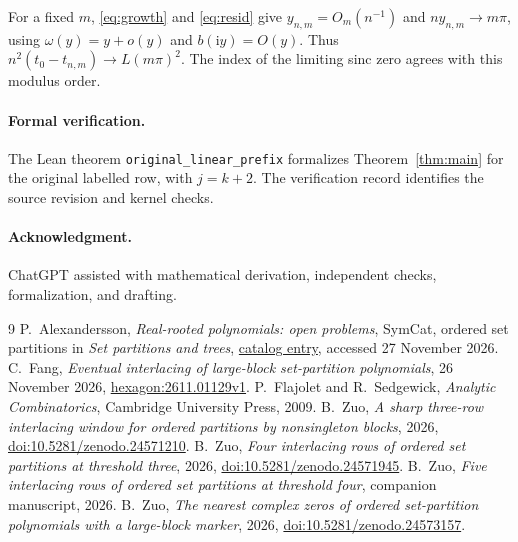 \documentclass[11pt]{article}
\newcommand{\ii}{\mathrm i}
\begin{document}
For a fixed $m$, \eqref{eq:growth} and \eqref{eq:resid} give
$y_{n,m}=O_m(n^{-1})$ and $ny_{n,m}\to m\pi$, using
$\omega(y)=y+o(y)$ and $b(\ii y)=O(y)$. Thus
$n^2(t_0-t_{n,m})\to L(m\pi)^2$. The index of the limiting
sinc zero agrees with this modulus order.

\paragraph{Formal verification.}
The Lean theorem \texttt{original\_linear\_prefix} formalizes
Theorem~\ref{thm:main} for the original labelled row, with $j=k+2$.
The verification record identifies the source revision and kernel checks.

\paragraph{Acknowledgment.}
ChatGPT assisted with mathematical derivation, independent checks,
formalization, and drafting.

\begingroup
\small
\raggedright
\begin{thebibliography}{9}
P.~Alexandersson, \emph{Real-rooted polynomials: open problems},
SymCat, ordered set partitions in \emph{Set partitions and trees},
\href{https://www.symmetricfunctions.com/realRootedOpenProblems.htm\#set-partitions-and-trees}{catalog entry},
accessed 27 November 2026.
C.~Fang, \emph{Eventual interlacing of large-block set-partition polynomials},
26 November 2026, \href{https://hexagonmath.org/pdf/2611.01129v1}{hexagon:2611.01129v1}.
P.~Flajolet and R.~Sedgewick, \emph{Analytic Combinatorics},
Cambridge University Press, 2009.
B.~Zuo, \emph{A sharp three-row interlacing window for ordered partitions by nonsingleton blocks},
2026, \href{https://doi.org/10.5281/zenodo.24571210}{doi:10.5281/zenodo.24571210}.
B.~Zuo, \emph{Four interlacing rows of ordered set partitions at threshold three},
2026, \href{https://doi.org/10.5281/zenodo.24571945}{doi:10.5281/zenodo.24571945}.
B.~Zuo, \emph{Five interlacing rows of ordered set partitions at threshold four},
companion manuscript, 2026.
B.~Zuo, \emph{The nearest complex zeros of ordered set-partition polynomials with a large-block marker},
2026, \href{https://doi.org/10.5281/zenodo.24573157}{doi:10.5281/zenodo.24573157}.
\end{thebibliography}
\endgroup
\end{document}
